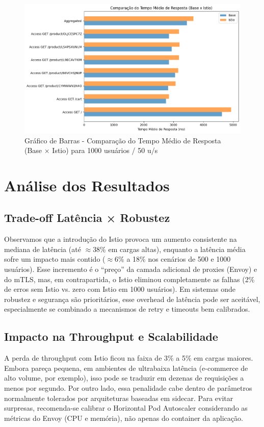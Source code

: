 \documentclass[12pt,a4paper]{report}
\begin{document}
\begin{figure}[H]
    \centering
    \includegraphics[width=1\linewidth]{figures/chart-locust_1000.png}
    \caption{Gráfico de Barras - Comparação do Tempo Médio de Resposta (Base $\times$ Istio) para 1000 usuários / 50 u/s}
    \label{fig:barchart-1000}
\end{figure}

\section{Análise dos Resultados}

\subsection{Trade-off Latência × Robustez}
Observamos que a introdução do Istio provoca um aumento consistente na mediana de latência (até $\approx$38\% em cargas altas), enquanto a latência média sofre um impacto mais contido ($\approx$6\% a 18\% nos cenários de 500 e 1000 usuários). Esse incremento é o ``preço'' da camada adicional de proxies (Envoy) e do mTLS, mas, em contrapartida, o Istio eliminou completamente as falhas (2\% de erros sem Istio vs. zero com Istio em 1000 usuários). Em sistemas onde robustez e segurança são prioritários, esse overhead de latência pode ser aceitável, especialmente se combinado a mecanismos de retry e timeouts bem calibrados.

\subsection{Impacto na Throughput e Scalabilidade}
A perda de throughput com Istio ficou na faixa de 3\% a 5\% em cargas maiores. Embora pareça pequena, em ambientes de ultrabaixa latência (e-commerce de alto volume, por exemplo), isso pode se traduzir em dezenas de requisições a menos por segundo. Por outro lado, essa penalidade cabe dentro de parâmetros normalmente tolerados por arquiteturas baseadas em sidecar. Para evitar surpresas, recomenda-se calibrar o Horizontal Pod Autoscaler considerando as métricas do Envoy (CPU e memória), não apenas do container da aplicação.
\end{document}
